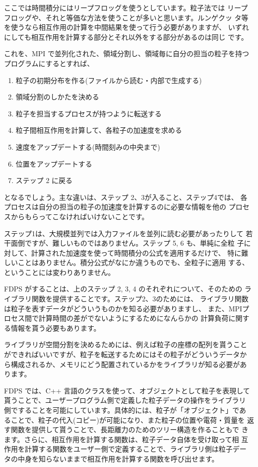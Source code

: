 \documentclass{jspf}            %
\begin{document}
ここでは時間積分にはリープフロッグを使うとしています。粒子法では
リープフロッグや、それと等価な方法を使うことが多いと思います。ルンゲクッ
タ等を使うなら相互作用の計算を中間結果を使って行う必要がありますが、
いずれにしても相互作用を計算する部分とそれ以外をする部分があるのは同じ
です。


これを、MPI で並列化された、領域分割し、領域毎に自分の担当の粒子を持つ
プログラムにするとすれば、

\begin{enumerate}

\item 粒子の初期分布を作る(ファイルから読む・内部で生成する)
\item 領域分割のしかたを決める
\item 粒子を担当するプロセスが持つように転送する
\item 粒子間相互作用を計算して、各粒子の加速度を求める
\item 速度をアップデートする(時間刻みの中央まで)
\item 位置をアップデートする  
\item ステップ 2 に戻る
\end{enumerate}

となるでしょう。主な違いは、ステップ 2、3が入ること、ステップ4では、
各プロセスは自分の担当の粒子の加速度を計算するのに必要な情報を他の
プロセスからもらってこなければいけないことです。


ステップ1は、大規模並列では入力ファイルを並列に読む必要があったりして
若干面倒ですが、難しいものではありません。ステップ 5, 6 も、単純に全粒
子に対して、計算された加速度を使って時間積分の公式を適用するだけで、
特に難しいことはありません。積分公式がなにか違うものでも、全粒子に適用
する、ということには変わりありません。

FDPS がすることは、上のステップ 2, 3, 4 のそれぞれについて、そのための
ライブラリ関数を提供することです。ステップ2、3のためには、
ライブラリ関数は粒子を表すデータがどういうものかを知る必要がありますし、
また、MPIプロセス間で計算時間の差がでないようにするためになんらかの
計算負荷に関する情報を貰う必要もあります。

ライブラリが空間分割を決めるためには、例えば粒子の座標の配列を貰うこと
ができればいいですが、粒子を転送するためにはその粒子がどういうデータか
ら構成されるか、メモリにどう配置されているかをライブラリが知る必要があ
ります。

FDPS では、C++ 言語のクラスを使って、オブジェクトとして粒子を表現して
貰うことで、ユーザープログラム側で定義した粒子データの操作をライブラリ
側ですることを可能にしています。具体的には、粒子が「オブジェクト」であ
ることで、粒子の代入(コピー)が可能になり、また粒子の位置や電荷・質量を
返す関数を提供して貰うことで、長距離力のためのツリー構造を作ることもで
きます。さらに、相互作用を計算する関数は、粒子データ自体を受け取って相
互作用を計算する関数をユーザー側で定義することで、ライブラリ側は粒子デー
タの中身を知らないままで相互作用を計算する関数を呼び出せます。
\end{document}
